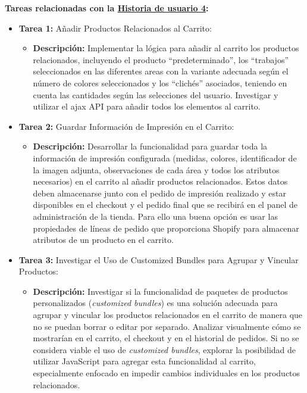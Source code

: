 \documentclass[11pt]{article}
\begin{document}
\textbf{Tareas relacionadas con la \hyperref[sec:historia4]{Historia de usuario 4}:}
\begin{itemize}
    \item \textbf{Tarea 1:} Añadir Productos Relacionados al Carrito:
          \begin{itemize}[label=--]
              \item \textbf{Descripción:} Implementar la lógica para añadir al carrito los productos relacionados, incluyendo el producto ``predeterminado'', los ``trabajos'' seleccionados en las diferentes areas con la variante adecuada según el número de colores seleccionados y los ``clichés'' asociados, teniendo en cuenta las cantidades según las selecciones del usuario. Investigar y utilizar el ajax API para añadir todos los elementos al carrito.
          \end{itemize}
    \item \textbf{Tarea 2:} Guardar Información de Impresión en el Carrito:
          \begin{itemize}[label=--]
              \item \textbf{Descripción:} Desarrollar la funcionalidad para guardar toda la información de impresión configurada (medidas, colores, identificador de la imagen adjunta, observaciones de cada área y todos los atributos necesarios) en el carrito al añadir productos relacionados. Estos datos deben almacenarse junto con el pedido de impresión realizado y estar disponibles en el checkout y el pedido final que se recibirá en el panel de administración de la tienda. Para ello una buena opción es usar las propiedades de líneas de pedido \cite{properties-lineitem} que proporciona Shopify para almacenar atributos de un producto en el carrito.
          \end{itemize}
    \item \textbf{Tarea 3:} Investigar el Uso de Customized Bundles para Agrupar y Vincular Productos:
          \begin{itemize}[label=--]
              \item \textbf{Descripción:} Investigar si la funcionalidad de paquetes de productos personalizados (\textit{customized bundles}) es una solución adecuada para agrupar y vincular los productos relacionados en el carrito de manera que no se puedan borrar o editar por separado. Analizar visualmente cómo se mostrarían en el carrito, el checkout y en el historial de pedidos. Si no se considera viable el uso de \textit{customized bundles}, explorar la posibilidad de utilizar JavaScript para agregar esta funcionalidad al carrito, especialmente enfocado en impedir cambios individuales en los productos relacionados.
          \end{itemize} 
\end{itemize}
\end{document}
